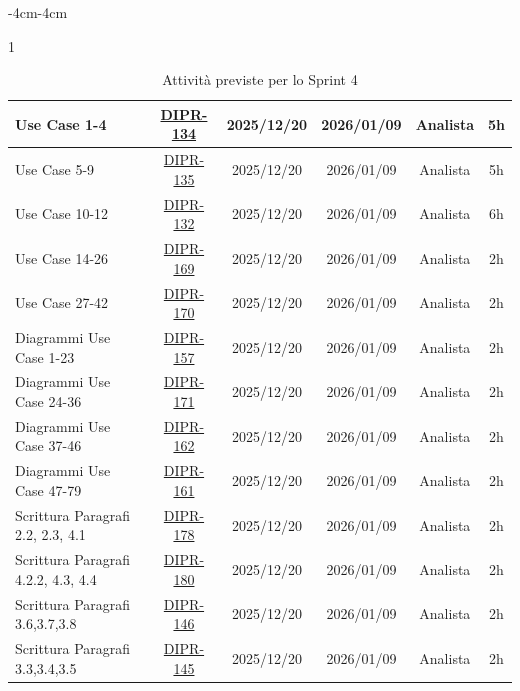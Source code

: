 \documentclass[a4paper,12pt]{article}
\begin{document}
\begin{table}[H]
\begin{adjustwidth}{-4cm}{-4cm}
\begin{spacing}{1}
\begin{tabular}{|p{4cm}|c|c|c|c|c|}
        \hline
        Use Case 1-4 & \href{https://7zpus.atlassian.net/browse/DIPR-134}{DIPR-134} & 2025/12/20 & 2026/01/09 & Analista & 5h\\
        \hline
        Use Case 5-9 & \href{https://7zpus.atlassian.net/browse/DIPR-135}{DIPR-135} & 2025/12/20 & 2026/01/09 & Analista & 5h\\
        \hline
        Use Case 10-12 & \href{https://7zpus.atlassian.net/browse/DIPR-132}{DIPR-132} & 2025/12/20 & 2026/01/09 & Analista & 6h\\
        \hline        
        Use Case 14-26& \href{https://7zpus.atlassian.net/browse/DIPR-169}{DIPR-169} & 2025/12/20 & 2026/01/09 & Analista & 2h \\
        \hline
        Use Case 27-42& \href{https://7zpus.atlassian.net/browse/DIPR-170}{DIPR-170} & 2025/12/20 & 2026/01/09 & Analista & 2h \\
        \hline
        Diagrammi Use Case 1-23 & \href{https://7zpus.atlassian.net/browse/DIPR-157}{DIPR-157} & 2025/12/20 & 2026/01/09 & Analista & 2h \\
        \hline
        Diagrammi Use Case 24-36 & \href{https://7zpus.atlassian.net/browse/DIPR-171}{DIPR-171} & 2025/12/20 & 2026/01/09 & Analista & 2h \\
        \hline
        Diagrammi Use Case 37-46 & \href{https://7zpus.atlassian.net/browse/DIPR-162}{DIPR-162} & 2025/12/20 & 2026/01/09 & Analista & 2h \\
        \hline
        Diagrammi Use Case 47-79& \href{https://7zpus.atlassian.net/browse/DIPR-161}{DIPR-161} & 2025/12/20 & 2026/01/09 & Analista & 2h \\
        \hline
        Scrittura Paragrafi 2.2, 2.3, 4.1 & \href{https://7zpus.atlassian.net/browse/DIPR-178}{DIPR-178} & 2025/12/20 & 2026/01/09 & Analista & 2h \\
        \hline
        Scrittura Paragrafi 4.2.2, 4.3, 4.4 & \href{https://7zpus.atlassian.net/browse/DIPR-180}{DIPR-180} & 2025/12/20 & 2026/01/09 & Analista & 2h \\
        \hline
        Scrittura Paragrafi 3.6,3.7,3.8& \href{https://7zpus.atlassian.net/browse/DIPR-146}{DIPR-146} & 2025/12/20 & 2026/01/09 & Analista & 2h \\
        \hline
        Scrittura Paragrafi 3.3,3.4,3.5 & \href{https://7zpus.atlassian.net/browse/DIPR-145}{DIPR-145} & 2025/12/20 & 2026/01/09 & Analista & 2h \\
        \hline
    \end{tabular}
    \end{spacing}
    \caption{Attività previste per lo Sprint 4}
    \end{adjustwidth}
\end{table}
\end{document}
